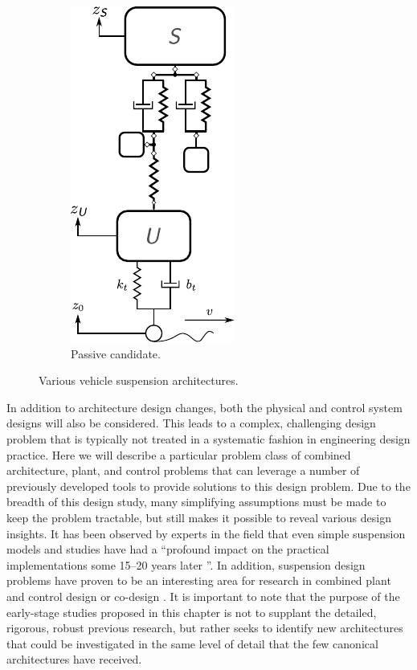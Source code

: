 \begin{figure}
\begin{subfigure}[t]{0.33\textwidth}
\includegraphics[scale=0.8]{../ch8/figures/csuspension6}
\caption{Passive candidate.\label{fig:ch8:csuspension6}}
\end{subfigure}%

\caption{Various vehicle suspension architectures.\label{fig:ch8:suspensions}}

\end{figure}

In addition to architecture design changes, both the physical and control system designs will also be considered.
This leads to a complex, challenging design problem that is typically not treated in a systematic fashion in engineering design practice.
Here we will describe a particular problem class of combined architecture, plant, and control problems that can leverage a number of previously developed tools to provide solutions to this design problem.
Due to the breadth of this design study, many simplifying assumptions must be made to keep the problem tractable, but still makes it possible to reveal various design insights.
It has been observed by experts in the field that even simple suspension models and studies have had a ``profound impact on the practical implementations some 15--20 years later \cite{Hrovat1993a}''.
In addition, suspension design problems have proven to be an interesting area for research in combined plant and control design or co-design \cite{Allison2014b, Alyaqout2007b, Fathy2003a}.
It is important to note that the purpose of the early-stage studies proposed in this chapter is not to supplant the detailed, rigorous, robust previous research, but rather seeks to identify new architectures that could be investigated in the same level of detail that the few canonical architectures have received. 

